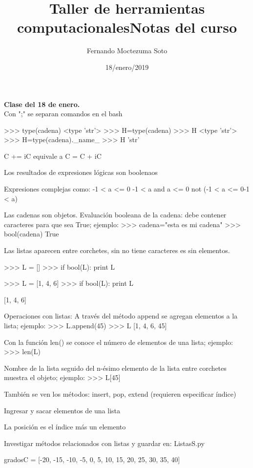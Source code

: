 \documentclass[etterpaper, 12pt, oneside]{article}%
\title{\Huge Taller de herramientas computacionales}
\author{Fernando Moctezuma Soto}
\date{18/enero/2019}
\begin{document}
	\maketitle
	
	\newpage
	
	\title{\Huge Notas del curso\\}
	
	\textbf{Clase del 18 de enero.}\\
	
	Con ";" se separan comandos en el bash
	
	>>> type(cadena)
	<type 'str'>
	>>> H=type(cadena)
	>>> H
	<type 'str'>
	>>> H=type(cadena)._name_
	>>> H
	'str'
	
	C += iC equivale a C = C + iC
	
	Los resultados de expresiones lógicas son boolenaos
	
	Expresiones complejas como:
	-1 < a <= 0
	-1 < a and a <= 0
	not (-1 < a <= 0-1 < a)
	
	Las cadenas son objetos.
	Evaluación booleana de la cadena: debe contener caracteres para que sea True; ejemplo:
	>>> cadena="esta es mi cadena"
	>>> bool(cadena)
	True
	
	Las listas aparecen entre corchetes, sin no tiene caracteres es sin elementos.
	
	>>> L = []
	>>> if bool(L):
			print L
			
	>>> L = [1, 4, 6]
	>>> if bool(L):
			print L
			
	[1, 4, 6]
	
	
	Operaciones con listas:
	A través del método append se agregan elementos a la lista; ejemplo:
	>>> L.append(45)
	>>> L
	[1, 4, 6, 45]
	
	Con la función len() se conoce el número de elementos de una lista; ejemplo:
	>>> len(L)
	
	Nombre de la lista seguido del n-ésimo elemento de la lista entre corchetes muestra el objeto; ejemplo: 
	>>> L[45]
	
	También se ven los métodos: insert, pop, extend (requieren especificar índice)
	
	Ingresar y sacar elementos de una lista
	
	La posición es el índice más un elemento
	
	Investigar métodos relacionados con listas y guardar en:
	ListasS.py
	
	gradosC = [-20, -15, -10, -5, 0, 5, 10, 15, 20, 25, 30, 35, 40]
	
\end{document}
